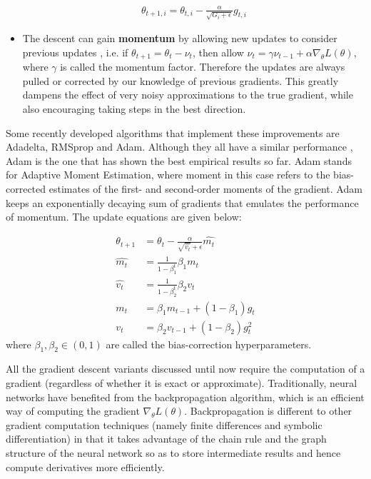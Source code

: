 \documentclass[pdftex,12pt,a4paper]{article}
\theoremstyle{definition}
\theoremstyle{remark}
\begin{document}
\begin{itemize}
    \begin{align*}
        \theta_{t+1, i} = \theta_{t, i} - \frac{\alpha}{\sqrt{G_i + \epsilon}}g_{t, i}
    \end{align*}
    \item The descent can gain \textbf{momentum} by allowing new updates to consider previous updates \cite{Sutskever2013}, i.e. if $\theta_{t+1} = \theta_t - \nu_t$, then allow $\nu_t = \gamma\nu_{t-1} + \alpha\nabla_\theta L(\theta)$, where $\gamma$ is called the momentum factor. Therefore the updates are always pulled or corrected by our knowledge of previous gradients. This greatly dampens the effect of very noisy approximations to the true gradient, while also encouraging taking steps in the best direction.
    
\end{itemize}

\par Some recently developed algorithms that implement these improvements are Adadelta, RMSprop and Adam. Although they all have a similar performance \cite{Kingma2014}, Adam is the one that has shown the best empirical results so far. Adam stands for Adaptive Moment Estimation, where moment in this case refers to the bias-corrected estimates of the first- and second-order moments of the gradient. Adam keeps an exponentially decaying sum of gradients that emulates the performance of momentum. The update equations are given below:

\begin{align*}
    \theta_{t+1} &= \theta_t - \frac{\alpha}{\sqrt{\hat{v_t}} + \epsilon}\hat{m_t}\\
    \hat{m_t} &= \frac{1}{1 - \beta_1^t}\beta_1 m_t\\
    \hat{v_t} &= \frac{1}{1 - \beta_2^t}\beta_2 v_t\\
    m_t &= \beta_1m_{t-1} + (1 - \beta_1)g_t\\
    v_t &= \beta_2v_{t-1} + (1 - \beta_2)g_t^2
\end{align*}
 where $\beta_1, \beta_2 \in (0, 1)$ are called the bias-correction hyperparameters.

\par All the gradient descent variants discussed until now require the computation of a gradient (regardless of whether it is exact or approximate). Traditionally, neural networks have benefited from the backpropagation algorithm, which is an efficient way of computing the gradient $\nabla_\theta L(\theta)$. Backpropagation is different to other gradient computation techniques (namely finite differences and symbolic differentiation) in that it takes advantage of the chain rule and the graph structure of the neural network so as to store intermediate results and hence compute derivatives more efficiently. 
\end{document}
